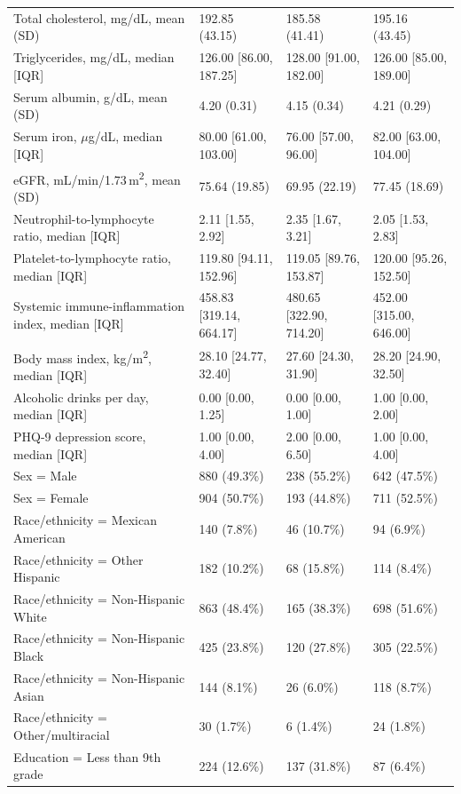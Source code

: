 \documentclass[12pt]{article}
\begin{document}
\begin{longtable}{L{4.6cm}R{3.35cm}R{3.35cm}R{3.35cm}}
Total cholesterol, mg/dL, mean (SD) & 192.85 (43.15) & 185.58 (41.41) & 195.16 (43.45) \\
Triglycerides, mg/dL, median [IQR] & 126.00 [86.00, 187.25] & 128.00 [91.00, 182.00] & 126.00 [85.00, 189.00] \\
Serum albumin, g/dL, mean (SD) & 4.20 (0.31) & 4.15 (0.34) & 4.21 (0.29) \\
Serum iron, $\mu$g/dL, median [IQR] & 80.00 [61.00, 103.00] & 76.00 [57.00, 96.00] & 82.00 [63.00, 104.00] \\
eGFR, mL/min/1.73\,m\textsuperscript{2}, mean (SD) & 75.64 (19.85) & 69.95 (22.19) & 77.45 (18.69) \\
Neutrophil-to-lymphocyte ratio, median [IQR] & 2.11 [1.55, 2.92] & 2.35 [1.67, 3.21] & 2.05 [1.53, 2.83] \\
Platelet-to-lymphocyte ratio, median [IQR] & 119.80 [94.11, 152.96] & 119.05 [89.76, 153.87] & 120.00 [95.26, 152.50] \\
Systemic immune-inflammation index, median [IQR] & 458.83 [319.14, 664.17] & 480.65 [322.90, 714.20] & 452.00 [315.00, 646.00] \\
Body mass index, kg/m\textsuperscript{2}, median [IQR] & 28.10 [24.77, 32.40] & 27.60 [24.30, 31.90] & 28.20 [24.90, 32.50] \\
Alcoholic drinks per day, median [IQR] & 0.00 [0.00, 1.25] & 0.00 [0.00, 1.00] & 1.00 [0.00, 2.00] \\
PHQ-9 depression score, median [IQR] & 1.00 [0.00, 4.00] & 2.00 [0.00, 6.50] & 1.00 [0.00, 4.00] \\
Sex = Male & 880 (49.3\%) & 238 (55.2\%) & 642 (47.5\%) \\
Sex = Female & 904 (50.7\%) & 193 (44.8\%) & 711 (52.5\%) \\
Race/ethnicity = Mexican American & 140 (7.8\%) & 46 (10.7\%) & 94 (6.9\%) \\
Race/ethnicity = Other Hispanic & 182 (10.2\%) & 68 (15.8\%) & 114 (8.4\%) \\
Race/ethnicity = Non-Hispanic White & 863 (48.4\%) & 165 (38.3\%) & 698 (51.6\%) \\
Race/ethnicity = Non-Hispanic Black & 425 (23.8\%) & 120 (27.8\%) & 305 (22.5\%) \\
Race/ethnicity = Non-Hispanic Asian & 144 (8.1\%) & 26 (6.0\%) & 118 (8.7\%) \\
Race/ethnicity = Other/multiracial & 30 (1.7\%) & 6 (1.4\%) & 24 (1.8\%) \\
Education = Less than 9th grade & 224 (12.6\%) & 137 (31.8\%) & 87 (6.4\%) \\

\end{longtable}
\end{document}
